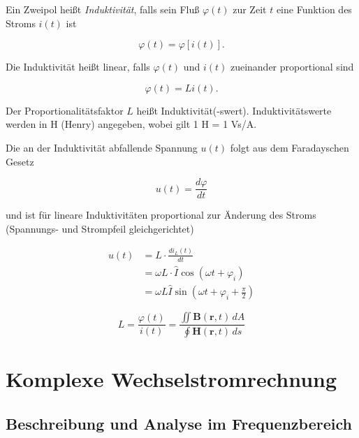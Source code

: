 \documentclass[
  ngerman,
  letterpaper,
]{scrbook}
\begin{document}
\begin{tcolorbox}[enhanced jigsaw, titlerule=0mm, rightrule=.15mm, toprule=.15mm, colback=white, toptitle=1mm, bottomrule=.15mm, coltitle=black, leftrule=.75mm, arc=.35mm, colbacktitle=quarto-callout-note-color!10!white, opacityback=0, bottomtitle=1mm, colframe=quarto-callout-note-color-frame, opacitybacktitle=0.6, breakable, title=\textcolor{quarto-callout-note-color}{\faInfo}\hspace{0.5em}{Induktivität \(L\) - Einheit: 1 H = 1 Vs/A}, left=2mm]

Ein Zweipol heißt \emph{Induktivität}, falls sein Fluß \(\varphi (t)\)
zur Zeit \(t\) eine Funktion des Stroms \(i(t)\) ist

\[
\varphi (t) = \varphi [i(t)].
\]

Die Induktivität heißt linear, falls \(\varphi (t)\) und \(i(t)\)
zueinander proportional sind

\[
\varphi (t) = L i(t).
\]

Der Proportionalitätsfaktor \(L\) heißt Induktivität(-swert).
Induktivitätswerte werden in H (Henry) angegeben, wobei gilt 1 H = 1
Vs/A.

Die an der Induktivität abfallende Spannung \(u(t)\) folgt aus dem
Faradayschen Gesetz

\[
u(t) = \frac{d \varphi}{dt}
\]

und ist für lineare Induktivitäten proportional zur Änderung des Stroms
(Spannungs- und Strompfeil gleichgerichtet)

\begin{align}
u(t) &= L \cdot \frac{di_L(t)}{dt} \\
&= \omega L \cdot \hat{I} \cos(\omega t + \varphi_i) \\
&= \omega L \hat{I} \sin(\omega t + \varphi_i + \frac{\pi}{2})
\end{align}

\[
L = \frac{\varphi(t)}{i(t)} = \frac{\iint \mathbf{B}(\mathbf{r},t) \, dA}{\oint \mathbf{H}(\mathbf{r},t) \, ds}
\]

\end{tcolorbox}

\chapter{Komplexe
Wechselstromrechnung}\label{komplexe-wechselstromrechnung}

\section{Beschreibung und Analyse im
Frequenzbereich}\label{beschreibung-und-analyse-im-frequenzbereich}
\end{document}
